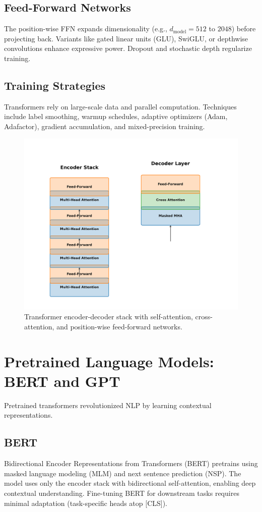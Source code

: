 ﻿\documentclass[12pt]{article}
\begin{document}
\subsection{Feed-Forward Networks}
The position-wise FFN expands dimensionality (e.g., $d_{\text{model}}=512$ to $2048$) before projecting back. Variants like gated linear units (GLU), SwiGLU, or depthwise convolutions enhance expressive power. Dropout and stochastic depth regularize training.

\subsection{Training Strategies}
Transformers rely on large-scale data and parallel computation. Techniques include label smoothing, warmup schedules, adaptive optimizers (Adam, Adafactor), gradient accumulation, and mixed-precision training.

\begin{figure}[H]
  \centering
  \includegraphics[width=0.85\linewidth]{transformer_layer_stack.png}
  \caption{Transformer encoder-decoder stack with self-attention, cross-attention, and position-wise feed-forward networks.}
  \label{fig:transformer_stack}
\end{figure}
\FloatBarrier

\section{Pretrained Language Models: BERT and GPT}
Pretrained transformers revolutionized NLP by learning contextual representations.

\subsection{BERT}
Bidirectional Encoder Representations from Transformers (BERT) pretrains using masked language modeling (MLM) and next sentence prediction (NSP). The model uses only the encoder stack with bidirectional self-attention, enabling deep contextual understanding. Fine-tuning BERT for downstream tasks requires minimal adaptation (task-specific heads atop [CLS]).
\end{document}
